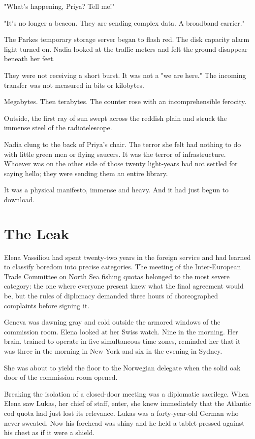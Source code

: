 \documentclass[11pt,a5paper,twoside]{book}
\begin{document}
"What's happening, Priya? Tell me!"

"It's no longer a beacon. They are sending complex data. A broadband carrier."

The Parkes temporary storage server began to flash red. The disk capacity alarm light turned on. Nadia looked at the traffic meters and felt the ground disappear beneath her feet.

They were not receiving a short burst. It was not a "we are here." The incoming transfer was not measured in bits or kilobytes.

Megabytes. Then terabytes. The counter rose with an incomprehensible ferocity.

Outside, the first ray of sun swept across the reddish plain and struck the immense steel of the radiotelescope.

Nadia clung to the back of Priya's chair. The terror she felt had nothing to do with little green men or flying saucers. It was the terror of infrastructure. Whoever was on the other side of those twenty light-years had not settled for saying hello; they were sending them an entire library.

It was a physical manifesto, immense and heavy. And it had just begun to download.

\chapter{The Leak}

Elena Vassiliou had spent twenty-two years in the foreign service and had learned to classify boredom into precise categories. The meeting of the Inter-European Trade Committee on North Sea fishing quotas belonged to the most severe category: the one where everyone present knew what the final agreement would be, but the rules of diplomacy demanded three hours of choreographed complaints before signing it.

Geneva was dawning gray and cold outside the armored windows of the commission room. Elena looked at her Swiss watch. Nine in the morning. Her brain, trained to operate in five simultaneous time zones, reminded her that it was three in the morning in New York and six in the evening in Sydney.

She was about to yield the floor to the Norwegian delegate when the solid oak door of the commission room opened.

Breaking the isolation of a closed-door meeting was a diplomatic sacrilege. When Elena saw Lukas, her chief of staff, enter, she knew immediately that the Atlantic cod quota had just lost its relevance. Lukas was a forty-year-old German who never sweated. Now his forehead was shiny and he held a tablet pressed against his chest as if it were a shield.
\end{document}
